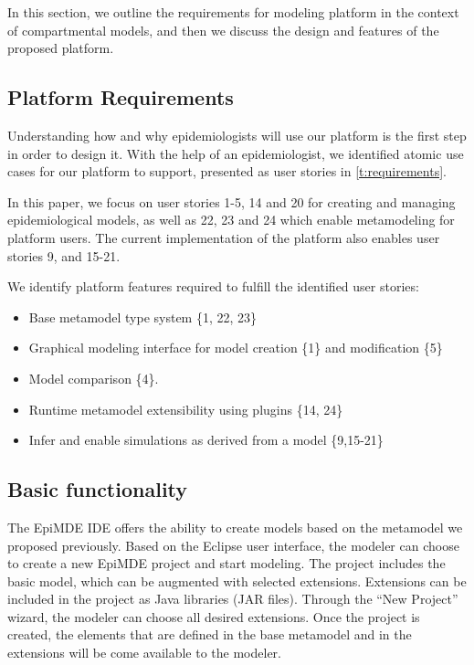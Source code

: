 
In this section, we outline the requirements for modeling platform in the context of compartmental models, and then we discuss the design and features of the proposed platform.

\subsection{Platform Requirements}

Understanding how and why epidemiologists will use our platform is the first step in order to design it.
With the help of an epidemiologist, we identified atomic use cases for our platform to support, presented as user stories in \autoref{t:requirements}.

In this paper, we focus on user stories 1-5, 14 and 20 for creating and managing epidemiological models, as well as 22, 23 and 24 which enable metamodeling for platform users. The current implementation of the platform also enables user stories 9, and 15-21.

We identify platform features required to fulfill the identified user stories:
\begin{itemize}
    \item Base metamodel type system \{1, 22, 23\}
    \item Graphical modeling interface for model creation \{1\} and modification \{5\}
    \item Model comparison \{4\}.
    \item Runtime metamodel extensibility using plugins \{14, 24\}
    \item Infer and enable simulations as derived from a model \{9,15-21\}
\end{itemize}

\subsection{Basic functionality}

The EpiMDE IDE offers the ability to create models based on the metamodel we proposed previously. Based on the Eclipse user interface, the modeler can choose to create a new EpiMDE project and start modeling. The project includes the basic model, which can be augmented with selected extensions. Extensions can be included in the project as Java libraries (JAR files). Through the ``New Project'' wizard, the modeler can choose all desired extensions. Once the project is created, the elements that are defined in the base metamodel and in the extensions will be come available to the modeler. 

